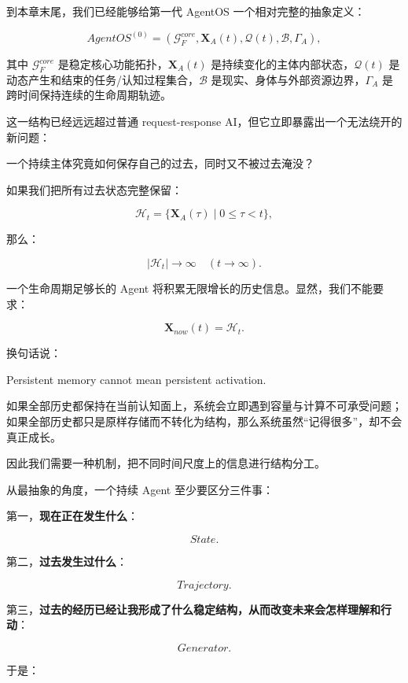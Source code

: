 到本章末尾，我们已经能够给第一代 AgentOS 一个相对完整的抽象定义：

\[
\boxed{
AgentOS^{(0)}
=
\left(
\mathcal{G}_{F}^{core},
\mathbf{X}_A(t),
\mathcal{Q}(t),
\mathcal{B},
\Gamma_A
\right),
}
\]

其中 $\mathcal{G}_{F}^{core}$ 是稳定核心功能拓扑，$\mathbf{X}_A(t)$ 是持续变化的主体内部状态，$\mathcal{Q}(t)$ 是动态产生和结束的任务/认知过程集合，$\mathcal{B}$ 是现实、身体与外部资源边界，$\Gamma_A$ 是跨时间保持连续的生命周期轨迹。

这一结构已经远远超过普通 request-response AI，但它立即暴露出一个无法绕开的新问题：

\begin{statementbox}
一个持续主体究竟如何保存自己的过去，同时又不被过去淹没？
\end{statementbox}

如果我们把所有过去状态完整保留：

\[
\mathcal{H}_t
=
\{
\mathbf{X}_A(\tau)
\mid
0\leq \tau<t
\},
\]

那么：

\[
|\mathcal{H}_t|
\rightarrow
\infty
\quad
(t\rightarrow\infty).
\]

一个生命周期足够长的 Agent 将积累无限增长的历史信息。显然，我们不能要求：

\[
\mathbf{X}_{now}(t)
=
\mathcal{H}_t.
\]

换句话说：

\begin{statementbox}
Persistent memory cannot mean persistent activation.
\end{statementbox}

如果全部历史都保持在当前认知面上，系统会立即遇到容量与计算不可承受问题；如果全部历史都只是原样存储而不转化为结构，那么系统虽然“记得很多”，却不会真正成长。

因此我们需要一种机制，把不同时间尺度上的信息进行结构分工。

从最抽象的角度，一个持续 Agent 至少要区分三件事：

第一，\textbf{现在正在发生什么}：

\[
State.
\]

第二，\textbf{过去发生过什么}：

\[
Trajectory.
\]

第三，\textbf{过去的经历已经让我形成了什么稳定结构，从而改变未来会怎样理解和行动}：

\[
Generator.
\]

于是：

\begin{statementbox}
\centering
{}
\end{statementbox}

